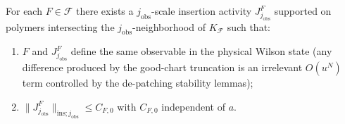\begin{lemma}\label{lem:F_to_J}
For each $F\in\mathcal F$ there exists a $j_{\mathrm{obs}}$-scale insertion activity $J^F_{j_{\mathrm{obs}}}$
supported on polymers intersecting the $j_{\mathrm{obs}}$-neighborhood of $K_{\mathcal F}$ such that:
\begin{enumerate}[label=(\alph*)]
\item $F$ and $J^F_{j_{\mathrm{obs}}}$ define the same observable in the physical Wilson state (any difference produced by the good-chart truncation is an irrelevant $O(u^N)$ term controlled by the de-patching stability lemmas);
\item $\|J^F_{j_{\mathrm{obs}}}\|_{\mathrm{ins};j_{\mathrm{obs}}}\le C_{F,0}$ with $C_{F,0}$ independent of $a$.
\end{enumerate}
\end{lemma}

